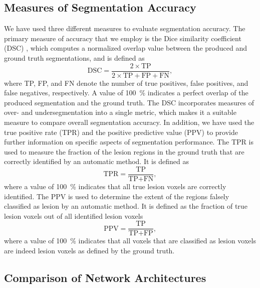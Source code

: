 \subsection{Measures of Segmentation Accuracy}

We have used three different measures to evaluate segmentation accuracy. The
primary measure of accuracy that we employ is the Dice similarity coefficient
(DSC) \cite{dice1945measures}, which computes a normalized overlap value between
the produced and ground truth segmentations, and is defined as
\begin{equation}
\text{DSC} = \frac{2 \times \text{TP}}{2 \times \text{TP} + \text{FP} +
\text{FN}},
\end{equation}
where TP, FP, and FN denote the number of true positives, false positives, and
false negatives, respectively. A value of \SI{100}{\percent} indicates a perfect
overlap of the produced segmentation and the ground truth.
The DSC incorporates measures of over- and undersegmentation into a single
metric, which makes it a suitable measure to compare overall segmentation
accuracy.
In addition, we have used the true positive rate (TPR) and the positive
predictive value (PPV) to provide further information on specific aspects of
segmentation performance. The TPR is used to measure the fraction of the lesion
regions in the ground truth that are correctly identified by
an automatic method. It is defined as
\begin{equation}
\text{TPR} = \frac{\text{TP}}{\text{TP} + \text{FN}},
\end{equation}
where a value of \SI{100}{\percent} indicates that all true lesion voxels are
correctly identified. The PPV is used to determine the extent of the regions
falsely classified as lesion by an automatic method. It is defined as the
fraction of true lesion voxels out of all identified lesion voxels
\begin{equation}
\text{PPV} = \frac{\text{TP}}{\text{TP} + \text{FP}},
\end{equation}
where a value of \SI{100}{\percent} indicates that all voxels that are
classified as lesion voxels are indeed lesion voxels as defined by the ground
truth.

\subsection{Comparison of Network Architectures}

